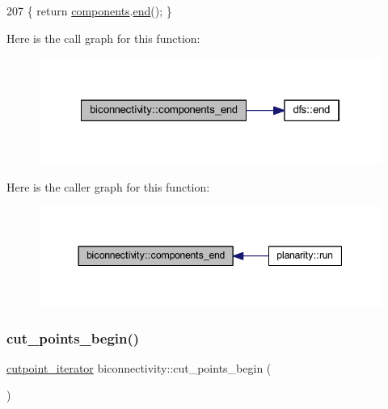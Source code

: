 \begin{DoxyCode}
207     \{ \textcolor{keywordflow}{return} \mbox{\hyperlink{classcomponents}{components}}.\mbox{\hyperlink{classdfs_af847633fa642258d3522e8deb26aef37}{end}}(); \}
\end{DoxyCode}
Here is the call graph for this function\+:\nopagebreak
\begin{figure}[H]
\begin{center}
\leavevmode
\includegraphics[width=322pt]{classbiconnectivity_a0bd1c70975e664174e591efd64f8dc71_cgraph}
\end{center}
\end{figure}
Here is the caller graph for this function\+:\nopagebreak
\begin{figure}[H]
\begin{center}
\leavevmode
\includegraphics[width=344pt]{classbiconnectivity_a0bd1c70975e664174e591efd64f8dc71_icgraph}
\end{center}
\end{figure}
\mbox{\label{classbiconnectivity_a473197552874aaf148e847838144eed7}} 
\subsubsection{\texorpdfstring{cut\+\_\+points\+\_\+begin()}{cut\_points\_begin()}}
{\footnotesize\ttfamily \mbox{\hyperlink{classbiconnectivity_ac9063160d59ab0ea4fa924a68395700b}{cutpoint\+\_\+iterator}} biconnectivity\+::cut\+\_\+points\+\_\+begin (\begin{DoxyParamCaption}{ }\end{DoxyParamCaption})\hspace{0.3cm}{\ttfamily [inline]}}



